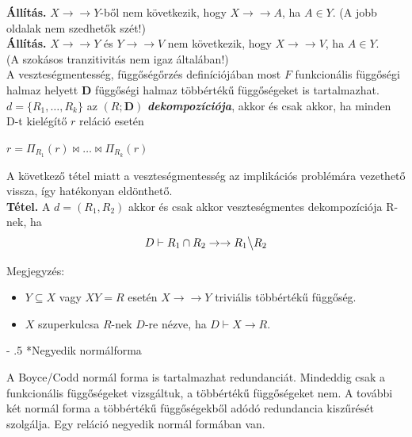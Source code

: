 \documentclass[tikz,12pt,margin=0px]{article}
\makeatletter
\renewcommand\paragraph{%
	\@startsection{paragraph}{4}{0mm}%
	{-\baselineskip}%
	{.5\baselineskip}%
	{\normalfont\normalsize\bfseries}}
\makeatother
\begin{document}
{    \noindent \textbf{Állítás.} $X \to\to Y$-ből nem következik, hogy $X \to\to A$, ha $A \in Y$. (A jobb oldalak nem szedhetők szét!)\\

    \noindent \textbf{Állítás.} $X \to\to Y$ és $Y \to\to V$ nem következik, hogy $X \to\to V$, ha $A \in Y$.\\
    (A szokásos tranzitivitás nem igaz általában!)\\

	\noindent A veszteségmentesség, függőségőrzés definíciójában most $F$ funkcionális függőségi halmaz helyett $\textbf{D}$ függőségi halmaz többértékű függőségeket is tartalmazhat. \\

    \noindent $d=\{R_1, \ldots, R_k\}$ az $(R; \textbf{D})$ \emph{\textbf{dekompozíciója}}, akkor és csak akkor, ha minden D-t kielégítő $r$ reláció esetén
    \begin{center}
        $r = \Pi_{R_1}(r) \bowtie \ldots \bowtie \Pi_{R_k}(r)$
    \end{center}

    \noindent A következő tétel miatt a veszteségmentesség az implikációs problémára vezethető vissza, így hatékonyan eldönthető.\\
	
    \noindent \textbf{Tétel.} A $d=(R_1,R_2)$ akkor és csak akkor veszteségmentes dekompozíciója R-nek, ha
    \[
        D \vdash R_1 \cap R_2 \to\to R_1 \big\backslash R_2
    \]

    \noindent Megjegyzés:

    \begin{itemize}
      \item $Y \subseteq X$ vagy $XY = R$ esetén $X \to\to Y$ triviális többértékű függőség.
      \item $X$ szuperkulcsa $R$-nek $D$-re nézve, ha $D \vdash X \to R$.
    \end{itemize}

    \paragraph*{Negyedik normálforma\\}

    \noindent A Boyce/Codd normál forma is tartalmazhat redundanciát. Mindeddig csak a funkcionális függőségeket vizsgáltuk, a többértékű függőségeket nem. A további két normál forma a többértékű függőségekből adódó redundancia kiszűrését szolgálja. Egy reláció negyedik normál formában van.\\

}
\end{document}
